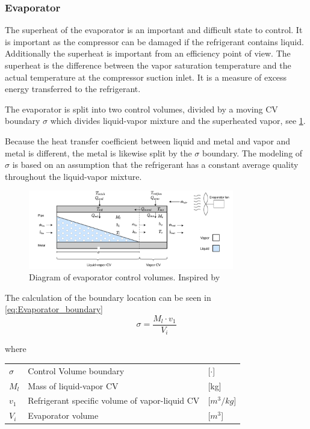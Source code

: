 \subsubsection{Evaporator}
The superheat of the evaporator is an important and difficult state to control. It is important as the compressor can be damaged if the refrigerant contains liquid. Additionally the superheat is important from an efficiency point of view.
The superheat is the difference between the vapor saturation temperature and the actual temperature at the compressor suction inlet. It is a measure of excess energy transferred to the refrigerant.

The evaporator is split into two control volumes, divided by a moving CV boundary $\sigma$ which divides liquid-vapor mixture and the superheated vapor, see \cref{fig:evapo_CV}.

Because the heat transfer coefficient between liquid and metal and vapor and metal is different, the metal is likewise split by the $\sigma$ boundary. The modeling of $\sigma$ is based on an assumption that the refrigerant has a constant average quality throughout the liquid-vapor mixture.

\begin{figure}[h!]
	\centering
	\includegraphics[width=0.8\textwidth]{Graphics/Evaporator_CV_diagram.pdf}
	\caption{Diagram of evaporator control volumes. Inspired by  \cite{Sorensen2013} \cite{Borlum2016}}
	\label{fig:evapo_CV}
\end{figure}






The calculation of the boundary location can be seen in \cref{eq:Evaporator_boundary}
\begin{equation} \label{eq:Evaporator_boundary}
	\sigma = \frac{M_l \cdot v_1}{V_i}
\end{equation}

where

\begin{center}
	\begin{tabular}{l p{8cm} l}
		$\sigma$ & Control Volume boundary                        & [$\cdot$]            \\
		$M_l$    & Mass of liquid-vapor CV                        & [\si{kg}]            \\
		$v_1$    & Refrigerant specific volume of vapor-liquid CV & [$\si{m}^3/\si{kg}$] \\
		$V_i$    & Evaporator volume                              & [$\si{m}^3$]
	\end{tabular}
\end{center}


